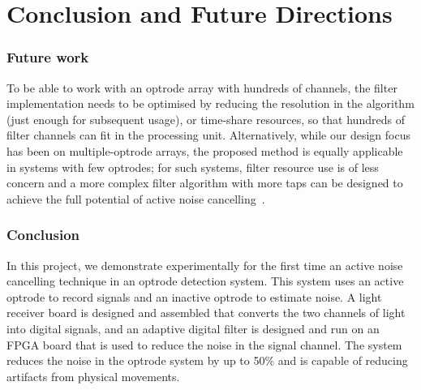 \chapter{Conclusion and Future Directions}\label{c:conclusion}

\subsection{Future work}

To be able to work with an optrode array with hundreds of channels, the filter implementation needs to be optimised by reducing the resolution in the algorithm (just enough for subsequent usage), or time-share resources, so that hundreds of filter channels can fit in the processing unit.  Alternatively, while our design focus has been on multiple-optrode arrays, the proposed method is equally applicable in systems with few optrodes;  for such systems, filter resource use is of less concern and a more complex filter algorithm with more taps can be designed to achieve the full potential of active noise cancelling~\cite{ANCHeadphone}.

\subsection{Conclusion}

In this project, we demonstrate experimentally for the first time an active noise cancelling technique in an optrode detection system. This system uses an active optrode to record signals and an inactive optrode to estimate noise. A light receiver board is designed and assembled that converts the two channels of light into digital signals, and an adaptive digital filter is designed and run on an FPGA board that is used to reduce the noise in the signal channel. The system reduces the noise in the optrode system by up to 50\% and is capable of reducing artifacts from physical movements.
